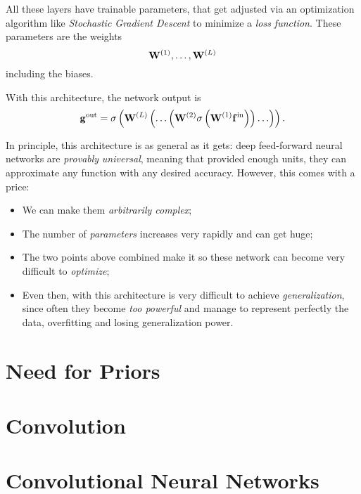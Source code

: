 All these layers have trainable parameters, that get adjusted via an optimization algorithm like \emph{Stochastic Gradient Descent} to minimize a \emph{loss function}. These parameters are the weights
\[
    \vb{W}^{(1)}, \hdots, \vb{W}^{(L)}
\]
including the biases.

With this architecture, the network output is 
\begin{equation}
    \mathbf{g}^{\mathrm{out}} = \sigma\left( \vb{W}^{(L)} \left( \hdots \left( \mathbf{W}^{(2)} \sigma\left( \mathbf{W}^{(1)} \mathbf{f}^{\mathrm{in}}  \right) \right) \hdots \right) \right).
\end{equation}

In principle, this architecture is as general as it gets: deep feed-forward neural networks are \textit{provably} \emph{universal}, meaning that provided enough units, they can approximate any function with any desired accuracy. However, this comes with a price:
\begin{itemize}
    \item We can make them \emph{arbitrarily complex};
    
    \item The number of \emph{parameters} increases very rapidly and can get huge;
    
    \item The two points above combined make it so these network can become very difficult to \emph{optimize};
    
    \item Even then, with this architecture is very difficult to achieve \emph{generalization}, since often they become \textit{too powerful} and manage to represent perfectly the data, overfitting and losing generalization power.
\end{itemize}

\section{Need for Priors} 

\section{Convolution} 

\section{Convolutional Neural Networks} 

